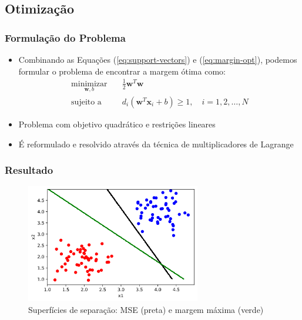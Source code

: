 \documentclass{beamer}
\begin{document}

\subsection{Otimização}

\begin{frame}
	\frametitle{Formulação do Problema}
	\begin{itemize}
		\item Combinando as Equações (\ref{eq:support-vectors}) e (\ref{eq:margin-opt}), podemos formular o problema de encontrar a margem ótima como:
		\begin{align}
			\underset{\textbf{w},b}{\text{minimizar}} \quad & \frac{1}{2}\textbf{w}^T\textbf{w} \\ 
			\text{sujeito a} \quad & d_i(\textbf{w}^T\textbf{x}_i + b) \geq 1, \quad i=1,2,\dots,N  \nonumber
			\label{eq:opt-prob1}
		\end{align} 
		\item Problema com objetivo quadrático e restrições lineares
		\item É reformulado e resolvido através da técnica de multiplicadores de Lagrange \cite{haykin}
	\end{itemize}
	
\end{frame}

\begin{frame}
	\frametitle{Resultado}
	\begin{figure}[h!]
		\centering
		\includegraphics[width=3in]{fig02.png}
		\caption{Superfícies de separação: MSE (preta) e margem máxima (verde)}
		\label{fig:opt-margin-ds}
	\end{figure}
\end{frame}
\end{document}
